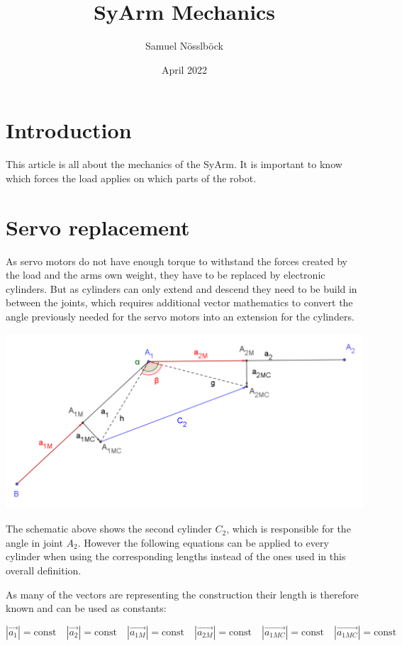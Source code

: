 \documentclass{article}
\title{SyArm Mechanics}
\author{Samuel Nösslböck}
\date{April 2022}
\begin{document}
\maketitle

\section{Introduction}
    This article is all about the mechanics of the SyArm. It is important to know which forces the load applies on which parts of the robot.
    
\section{Servo replacement}
    As servo motors do not have enough torque to withstand the forces created by the load and the arms own weight, they have to be replaced by electronic cylinders. But as cylinders can only extend and descend they need to be build in between the joints, which requires additional vector mathematics to convert the angle previously needed for the servo motors into an extension for the cylinders.
    
    \begin{center}
        \includegraphics[scale=0.45]{images/Cylinder.PNG}
    \end{center}
    
    The schematic above shows the second cylinder $C_2$, which is responsible for the angle in joint $A_2$. However the following equations can be applied to every cylinder when using the corresponding lengths instead of the ones used in this overall definition.
    
    As many of the vectors are representing the construction their length is therefore known and can be used as constants:
    
    \begin{equation}
        |\vec{a_{1}}| = \text{const} \quad |\vec{a_{2}}| = \text{const} \quad |\vec{a_{1M}}| = \text{const} \quad |\vec{a_{2M}}| = \text{const} \quad |\vec{a_{1MC}}| = \text{const} \quad |\vec{a_{1MC}}| = \text{const}
    \end{equation}
    
\end{document}
